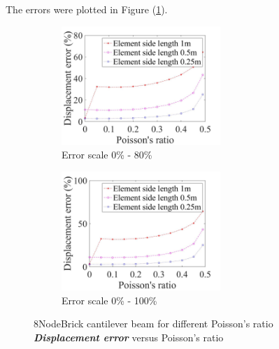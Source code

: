 \documentclass[fleqn,11pt]{article}
\begin{document}
The errors were plotted in Figure (\ref{fig error 8NodeBrick cantilever beam for different Poisson's ratio}).
\begin{figure}[H]
  \begin{subfigure}{0.5\textwidth}
    \centering
    \includegraphics[width=6cm]{../Figure-files/error8brick_beam_different_poisson_ratio_disp_div.jpeg}
    \caption{Error scale 0\% - 80\%}
  \end{subfigure}
  \begin{subfigure}{0.5\textwidth}
    \centering
    \includegraphics[width=6cm]{../Figure-files/error8brick_beam_different_poisson_ratio_disp_div100.jpeg}
    \caption{Error scale 0\% - 100\%}
  \end{subfigure}
  \captionsetup{justification=centering,margin=3cm}
  \caption{8NodeBrick cantilever beam for different Poisson's ratio\\
      \emph{\textbf{Displacement error}}   versus   Poisson's ratio}
  \label{fig error 8NodeBrick cantilever beam for different Poisson's ratio}
\end{figure}
\end{document}
